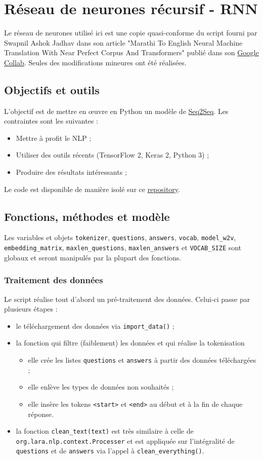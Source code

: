 \documentclass[10pt,a4paper]{article}
\newcommand\tab[1][0.5cm]{\hspace*{#1}}
\begin{document}
\section{Réseau de neurones récursif - RNN}
Le réseau de neurones utilisé ici est une copie quasi-conforme du script fourni par Swapnil Ashok Jadhav dans son article "Marathi To English Neural Machine Translation With Near Perfect Corpus And Transformers" publié dans son \href{https://colab.research.google.com/drive/11os3isH4I4X76dwOAQJ5cSRnfhmUziHm#scrollTo=dHBP5xzmrM4U}{Google Collab}. Seules des modifications mineures ont été réalisées.
\subsection{Objectifs et outils}
L'objectif est de mettre en œuvre en Python un modèle de \href{https://arxiv.org/abs/1409.3215}{Seq2Seq}. Les contraintes sont les suivantes :
\begin{itemize}
\item Mettre à profit le NLP ;
\item Utiliser des outils récents (TensorFlow 2, Keras 2, Python 3) ;
\item Produire des résultats intéressants ;
\end{itemize}
\tab Le code est disponible de manière isolé sur ce \href{https://github.com/LaraProject/seq2seq}{repository}.
\subsection{Fonctions, méthodes et modèle}
Les variables et objets \texttt{tokenizer}, \texttt{questions}, \texttt{answers}, \texttt{vocab}, \texttt{model\_w2v}, \texttt{embedding\_matrix}, \texttt{maxlen\_questions}, \texttt{maxlen\_answers} et \texttt{VOCAB\_SIZE} sont globaux et seront manipulés par la plupart des fonctions.
\subsubsection{Traitement des données}
Le script réalise tout d'abord un pré-traitement des données. Celui-ci passe par plusieurs étapes :
\begin{itemize}
\item le téléchargement des données via \texttt{import\_data()} ;
\item la fonction qui filtre (faiblement) les données et qui réalise la tokenisation
\begin{itemize}
\item elle crée les listes \texttt{questions} et \texttt{answers} à partir des données téléchargées ;
\item elle enlève les types de données non souhaités ;
\item elle insère les tokens \texttt{<start>} et \texttt{<end>} au début et à la fin de chaque réponse.
\end{itemize}
\item la fonction \texttt{clean\_text(text)} est très similaire à celle de \texttt{org.lara.nlp.context.Processer} et est appliquée sur l'intégralité de \texttt{questions} et de \texttt{answers} via l'appel à \texttt{clean\_everything()}.
\end{itemize}
\end{document}
